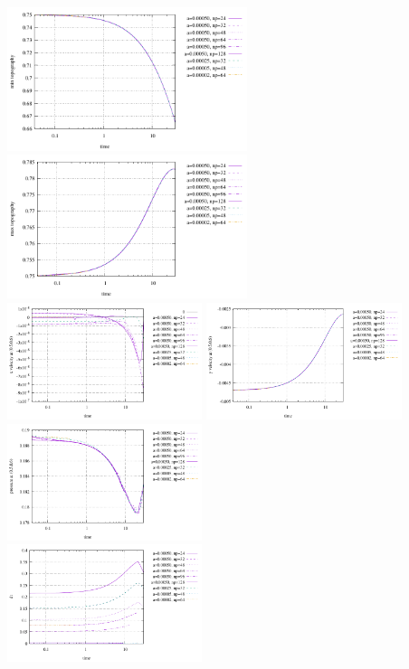 \begin{center}
\includegraphics[width=7cm]{python_codes/fieldstone_93/results/topography_min}
\includegraphics[width=7cm]{python_codes/fieldstone_93/results/topography_max}\\
\includegraphics[width=5.7cm]{python_codes/fieldstone_93/results/point_u}
\includegraphics[width=5.7cm]{python_codes/fieldstone_93/results/point_v}
\includegraphics[width=5.7cm]{python_codes/fieldstone_93/results/point_p}\\
\includegraphics[width=5.7cm]{python_codes/fieldstone_93/results/dt}

\end{center}
